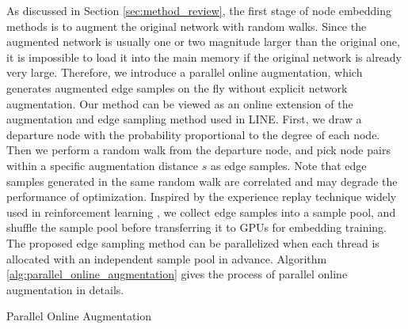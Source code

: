 \documentclass[sigconf]{acmart}
\begin{document}
As discussed in Section \ref{sec:method_review}, the first stage of node embedding methods is to augment the original network with random walks. Since the augmented network is usually one or two magnitude larger than the original one, it is impossible to load it into the main memory if the original network is already very large. Therefore, we introduce a parallel online augmentation, which generates augmented edge samples on the fly without explicit network augmentation. Our method can be viewed as an online extension of the augmentation and edge sampling method used in LINE\cite{tang2015line}. First, we draw a departure node with the probability proportional to the degree of each node. Then we perform a random walk from the departure node, and pick node pairs within a specific augmentation distance $s$ as edge samples. Note that edge samples generated in the same random walk are correlated and may degrade the performance of optimization. Inspired by the experience replay technique widely used in reinforcement learning \cite{lin1993reinforcement, mnih2013playing}, we collect edge samples into a sample pool, and shuffle the sample pool before transferring it to GPUs for embedding training. The proposed edge sampling method can be parallelized when each thread is allocated with an independent sample pool in advance. Algorithm \ref{alg:parallel_online_augmentation} gives the process of parallel online augmentation in details.

\begin{algorithm}
    \caption{Parallel Online Augmentation}
    \begin{algorithmic}[1]
             
                        \EndIf
                    \EndFor
                \EndWhile
            \EndFor
        \EndFunction
    \end{algorithmic}
    \label{alg:parallel_online_augmentation}
\end{algorithm}
\end{document}
